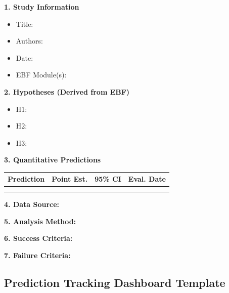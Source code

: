 \begin{tcolorbox}[colback=gray!5!white, colframe=gray!75!black,
    title=\textbf{EBF Pre-Registration Template}]

\textbf{1. Study Information}
\begin{itemize}[nosep]
    \item Title:
    \item Authors:
    \item Date:
    \item EBF Module(s):
\end{itemize}

\textbf{2. Hypotheses (Derived from EBF)}
\begin{itemize}[nosep]
    \item H1:
    \item H2:
    \item H3:
\end{itemize}

\textbf{3. Quantitative Predictions}

\begin{tabular}{@{}lccc@{}}
\toprule
Prediction & Point Est. & 95\% CI & Eval. Date \\
\midrule
& & & \\
& & & \\
\bottomrule
\end{tabular}

\textbf{4. Data Source:}

\textbf{5. Analysis Method:}

\textbf{6. Success Criteria:}

\textbf{7. Failure Criteria:}

\end{tcolorbox}

\subsection{Prediction Tracking Dashboard Template}

